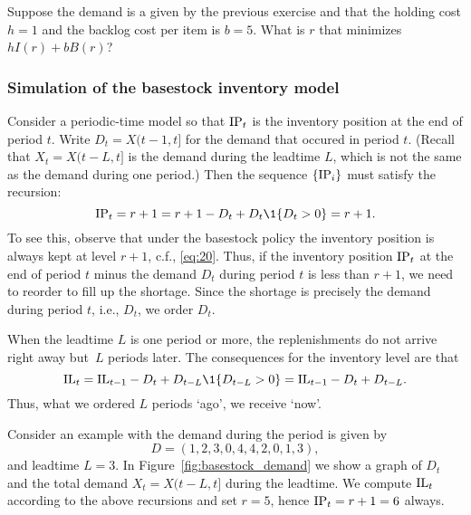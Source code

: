 \begin{question}
Suppose the demand is a given by the previous exercise and that the holding cost $h=1$ and the backlog cost per item is $b=5$.  What is $r$ that minimizes $hI(r)+bB(r)$?
\end{question}


\subsubsection{Simulation of the basestock inventory model}
\label{sec:simul-basest-invent}

Consider a periodic-time model so that $\textrm{IP}_t$ is the inventory position at the end of period $t$. Write $D_t = X(t-1, t]$ for the demand that occured in period $t$. (Recall that $X_t = X(t-L, t]$ is the demand during the leadtime $L$, which is not the same as the demand during one period.)
 Then the sequence $\{\textrm{IP}_i\}$ must satisfy the recursion:
\begin{equation}
  \label{eq:15}
  \IP_t = r+1 = r+1 - D_t + D_t \1{D_t>0} = r+1.
\end{equation}
To see this, observe that under the basestock policy the inventory
position is always kept at level $r+1$, c.f., \eqref{eq:20}. Thus, if
the inventory position $\textrm{IP}_t$ at the end of period $t$ minus the demand
$D_t$ during period $t$ is less than $r+1$, we need to reorder to fill up the
shortage. Since the shortage is precisely the demand during period
$t$, i.e., $D_t$, we order $D_t$. 


When the leadtime $L$ is one period or more, the replenishments do not arrive right away but~$L$ periods later. The consequences for the inventory level are that
\begin{equation}
  \label{eq:21}
  \IL_t = \IL_{t-1} - D_t + D_{t-L}\1{D_{t-L}>0} = \IL_{t-1} - D_t + D_{t-L}.
\end{equation}
Thus, what we ordered $L$ periods `ago', we receive `now'.

Consider an example with the demand during the period is given by
\begin{equation}\label{eq:demand_base}
  D = (1,2,3,0,4,4,2,0,1,3),
\end{equation}
and leadtime $L=3$. In Figure~\ref{fig:basestock_demand} we show a graph of $D_t$ and the total demand $X_t=X(t-L, t]$ during the leadtime. We compute $\textrm{IL}_t$ according to the above recursions and set $r=5$, hence $\textrm{IP}_t = r+1=6$ always.

